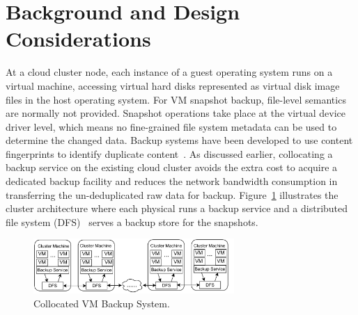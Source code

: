 

\section{Background and Design Considerations}
\label{sect:option}


At a cloud cluster node, each instance of a guest operating system runs on a virtual machine, accessing virtual hard disks 
represented as virtual disk image files in the host operating system.
For VM snapshot backup, file-level semantics are normally not provided.
Snapshot operations take place at the virtual device driver level, which
means no fine-grained file system metadata can be used to determine the changed data. 
Backup systems have been developed to use content fingerprints to identify duplicate
content~\cite{venti02,Rhea2008}.  
As discussed earlier, collocating a backup service on the existing
cloud cluster avoids the extra cost to acquire a dedicated backup facility
and reduces the network bandwidth consumption in transferring the un-deduplicated
raw data for backup. 
Figure~\ref{fig:collocated} illustrates the cluster architecture where
each physical runs a backup service and a distributed file system (DFS)~\cite{GFS2004,Hadoop} 
serves a backup store  for the snapshots.





\begin{figure}[htb]
    \centering
    \includegraphics[width=3in]{images/colocated-arch}
    \caption{Collocated VM Backup System.}
    \label{fig:collocated}
\end{figure}

